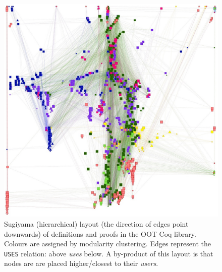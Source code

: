 \begin{figure}[tp]
  \begin{minipage}{0.5\textwidth-0.5em}
    \centering
    \includegraphics[width=\textwidth]{img/oot/hierarchical}
    \caption{Sugiyama (hierarchical) layout (the direction of edges point
      downwards) of definitions and proofs in the OOT Coq
      library. Colours are assigned by modularity clustering. Edges represent
      the \texttt{USES} relation: above \emph{uses} below. A by-product of
      this layout is that nodes are are placed higher/closest to their
      \emph{users}.}\label{fig:oot:hier}
  \end{minipage}%
  \hspace{1em}%
  \begin{minipage}{0.5\textwidth-0.5em}
    \centering

\end{minipage}
\end{figure}
